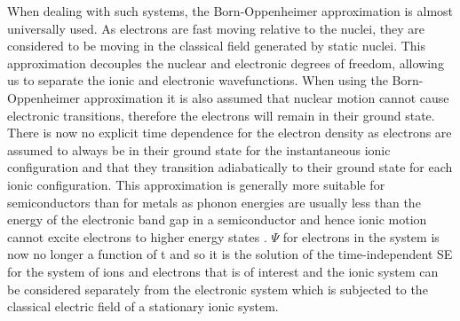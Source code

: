 \documentclass[11pt, twoside]{report}
\begin{document}
When dealing with such systems, the Born-Oppenheimer approximation is almost universally used. As electrons are fast moving relative to the nuclei, they are considered to be moving in the classical field generated by static nuclei. This approximation decouples the nuclear and electronic degrees of freedom, allowing us to separate the ionic and electronic wavefunctions. 
When using the Born-Oppenheimer approximation it is also assumed that nuclear motion cannot cause electronic transitions, therefore the electrons will remain in their ground state. There is now no explicit time dependence for the electron density as electrons are assumed to always be in their ground state for the instantaneous ionic configuration and that they transition adiabatically to their ground state for each ionic configuration. This approximation is generally more suitable for semiconductors than for metals as phonon energies are usually less than the energy of the electronic band gap in a semiconductor and hence ionic motion cannot excite electrons to higher energy states \cite{Prasad_ch2}. $\Psi$ for electrons in the system is now no longer a function of t and so it is the solution of the time-independent SE for the system of ions and electrons that is of interest and the ionic system can be considered separately from the electronic system which is subjected to the classical electric field of a stationary ionic system.
\end{document}
